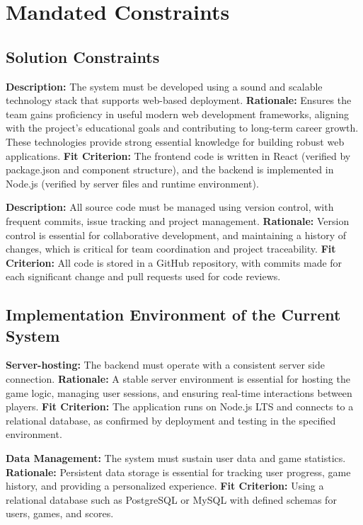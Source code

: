 \documentclass[12pt]{article}
\begin{document}
\section{Mandated Constraints}

\subsection{Solution Constraints}
\textbf{Description:} The system must be developed using a sound and scalable technology stack that supports web-based deployment.
\textbf{Rationale:} Ensures the team gains proficiency in useful modern web development frameworks, aligning with the project's educational goals and contributing to long-term career growth. These technologies provide strong essential knowledge for building robust web applications.
\textbf{Fit Criterion:} The frontend code is written in React (verified by package.json and component structure), and the backend is implemented in Node.js (verified by server files and runtime environment).

\textbf{Description:} All source code must be managed using version control, with frequent commits, issue tracking and project management.
\textbf{Rationale:} Version control is essential for collaborative development, and maintaining a history of changes, which is critical for team coordination and project traceability.
\textbf{Fit Criterion:} All code is stored in a GitHub repository, with commits made for each significant change and pull requests used for code reviews.

\subsection{Implementation Environment of the Current System}

\textbf{Server-hosting:} The backend must operate with a consistent server side connection.
\textbf{Rationale:} A stable server environment is essential for hosting the game logic, managing user sessions, and ensuring real-time interactions between players.
\textbf{Fit Criterion:} The application runs on Node.js LTS and connects to a relational database, as confirmed by deployment and testing in the specified environment.

\textbf{Data Management:} The system must sustain user data and game statistics.
\textbf{Rationale:} Persistent data storage is essential for tracking user progress, game history, and providing a personalized experience.
\textbf{Fit Criterion:} Using a relational database such as PostgreSQL or MySQL with defined schemas for users, games, and scores.
\end{document}
